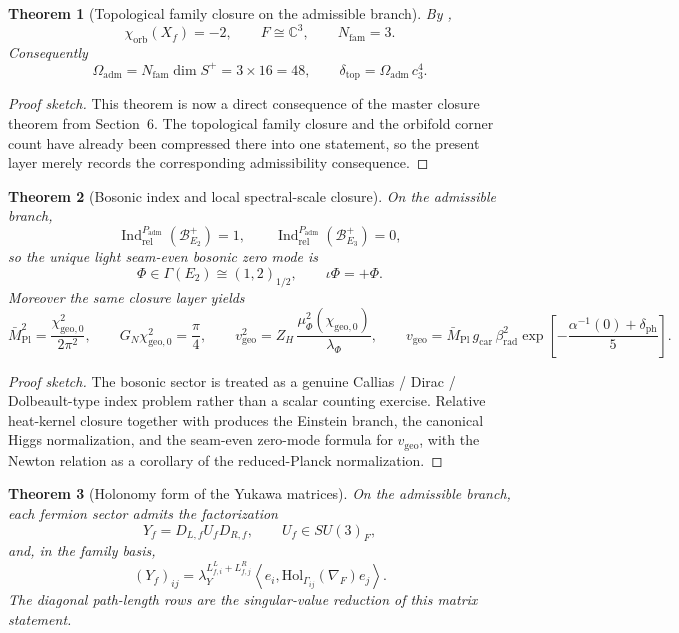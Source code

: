 \documentclass[11pt,a4paper]{article}
\newtheorem{theorem}{Theorem}[section]
\theoremstyle{definition}
\theoremstyle{remark}
\DeclareMathOperator{\Ind}{Ind}
\newcommand{\inv}{\iota}
\newcommand{\Mpl}{\bar M_{\mathrm{Pl}}}
\newcommand{\cthree}{c_3}
\newcommand{\deltatop}{\delta_{\mathrm{top}}}
\newcommand{\Oadm}{\Omega_{\mathrm{adm}}}
\newcommand{\lambdaY}{\lambda_Y}
\newcommand{\gcar}{g_{\mathrm{car}}}
\newcommand{\chigeozero}{\chi_{\mathrm{geo},0}}
\newcommand{\vgeo}{v_{\mathrm{geo}}}
\newcommand{\Padm}{P_{\mathrm{adm}}}
\begin{document}
\begin{theorem}[Topological family closure on the admissible branch]
By ,
\[
\chi_{\mathrm{orb}}(X_f)=-2,
\qquad
F\cong\mathbb C^3,
\qquad
N_{\mathrm{fam}}=3.
\]
Consequently
\[
\Oadm=N_{\mathrm{fam}}\dim S^+=3\times 16=48,
\qquad
\deltatop=\Oadm\,\cthree^4.
\]
\end{theorem}

\begin{proof}[Proof sketch]
This theorem is now a direct consequence of the master closure theorem from Section~6. The
topological family closure and the orbifold corner count have already been compressed there
into one statement, so the present layer merely records the corresponding admissibility
consequence.
\end{proof}

\begin{theorem}[Bosonic index and local spectral-scale closure]
On the admissible branch,
\[
\Ind_{\mathrm{rel}}^{\Padm}(\mathcal B_{E_2}^+)=1,
\qquad
\Ind_{\mathrm{rel}}^{\Padm}(\mathcal B_{E_3}^+)=0,
\]
so the unique light seam-even bosonic zero mode is
\[
\Phi\in\Gamma(E_2)\cong(1,2)_{1/2},
\qquad
\inv\Phi=+\Phi.
\]
Moreover the same closure layer yields
\[
\Mpl^2=\frac{\chigeozero^2}{2\pi^2},
\qquad
G_N\chigeozero^2=\frac{\pi}{4},
\qquad
\vgeo^2=Z_H\,\frac{\mu_\Phi^2(\chigeozero)}{\lambda_\Phi},
\qquad
\vgeo=\Mpl\,\gcar\,\beta_{\mathrm{rad}}^2
\exp\!\left[-\frac{\alpha^{-1}(0)+\delta_{\mathrm{ph}}}{5}\right].
\]
\end{theorem}

\begin{proof}[Proof sketch]
The bosonic sector is treated as a genuine Callias / Dirac / Dolbeault-type index problem rather than a scalar counting exercise. Relative heat-kernel closure together with  produces the Einstein branch, the canonical Higgs normalization, and the seam-even zero-mode formula for $\vgeo$, with the Newton relation as a corollary of the reduced-Planck normalization.
\end{proof}

\begin{theorem}[Holonomy form of the Yukawa matrices]
On the admissible branch, each fermion sector admits the factorization
\[
Y_f=D_{L,f}U_fD_{R,f},
\qquad
U_f\in SU(3)_F,
\]
and, in the family basis,
\[
(Y_f)_{ij}
=
\lambdaY^{L^L_{f,i}+L^R_{f,j}}
\left\langle e_i,\mathrm{Hol}_{\Gamma_{ij}}(\nabla_F)e_j\right\rangle.
\]
The diagonal path-length rows  are the singular-value reduction of this matrix statement.
\end{theorem}
\end{document}

